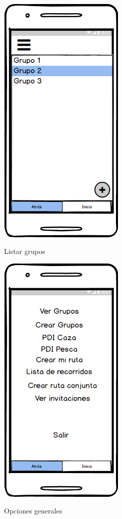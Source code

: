 	
	
	
	
	
	
	
	
	
	
	
	
	
	
	
	
	\begin{figure}[htbp]
\begin{minipage}[b]{0.5\linewidth} %
\centering
\includegraphics[width=6cm]{maqueta/lista-grupos.png}
 \label{figura1}
\caption{Listar grupos}

\end{minipage}
\hspace{0.5cm} %
\begin{minipage}[b]{0.5\linewidth}
\centering
\includegraphics[width=6cm]{maqueta/opciones.png}
 \label{figura2}
\caption{Opciones generales}


\end{minipage}
\end{figure}
